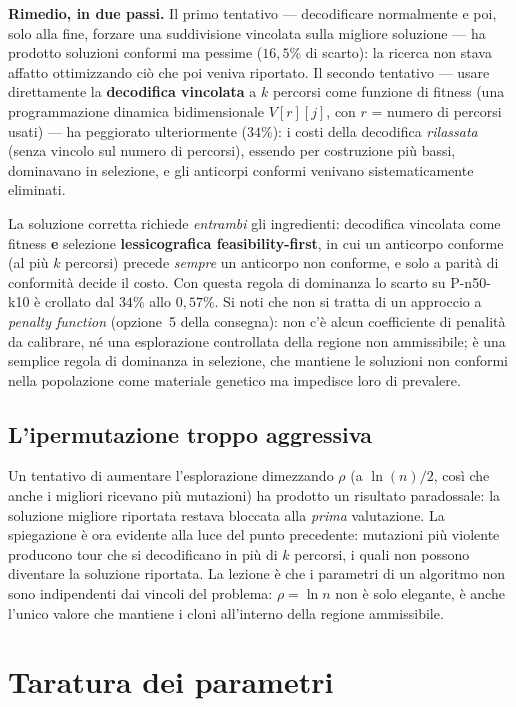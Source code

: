 \documentclass[10pt,a4paper]{article}
\begin{document}
\textbf{Rimedio, in due passi.} Il primo tentativo --- decodificare normalmente e
poi, solo alla fine, forzare una suddivisione vincolata sulla migliore soluzione
--- ha prodotto soluzioni conformi ma pessime ($16{,}5\%$ di scarto): la ricerca
non stava affatto ottimizzando ciò che poi veniva riportato. Il secondo tentativo
--- usare direttamente la \textbf{decodifica vincolata} a $k$ percorsi come
funzione di fitness (una programmazione dinamica bidimensionale
$V[r][j]$, con $r$ = numero di percorsi usati) --- ha peggiorato ulteriormente
($34\%$): i costi della decodifica \emph{rilassata} (senza vincolo sul numero di
percorsi), essendo per costruzione più bassi, dominavano in selezione, e gli
anticorpi conformi venivano sistematicamente eliminati.

La soluzione corretta richiede \emph{entrambi} gli ingredienti: decodifica
vincolata come fitness \textbf{e} selezione \textbf{lessicografica
feasibility-first}, in cui un anticorpo conforme (al più $k$ percorsi) precede
\emph{sempre} un anticorpo non conforme, e solo a parità di conformità decide il
costo. Con questa regola di dominanza lo scarto su P-n50-k10 è crollato dal
$34\%$ allo $0{,}57\%$. Si noti che non si tratta di un approccio a
\emph{penalty function} (opzione~5 della consegna): non c'è alcun coefficiente di
penalità da calibrare, né una esplorazione controllata della regione non
ammissibile; è una semplice regola di dominanza in selezione, che mantiene le
soluzioni non conformi nella popolazione come materiale genetico ma impedisce
loro di prevalere.

\subsection{L'ipermutazione troppo aggressiva}

Un tentativo di aumentare l'esplorazione dimezzando $\rho$ (a $\ln(n)/2$, così
che anche i migliori ricevano più mutazioni) ha prodotto un risultato
paradossale: la soluzione migliore riportata restava bloccata alla \emph{prima}
valutazione. La spiegazione è ora evidente alla luce del punto precedente:
mutazioni più violente producono tour che si decodificano in più di $k$ percorsi,
i quali non possono diventare la soluzione riportata. La lezione è che i
parametri di un algoritmo non sono indipendenti dai vincoli del problema: $\rho =
\ln n$ non è solo elegante, è anche l'unico valore che mantiene i cloni
all'interno della regione ammissibile.

\section{Taratura dei parametri}
\label{sec:tuning}
\end{document}
